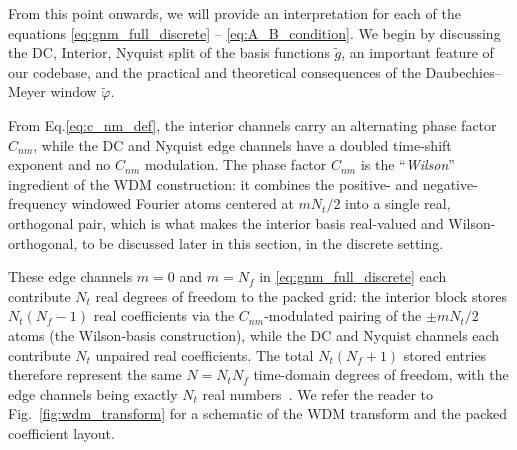 From this point onwards, we will provide an interpretation for each of the equations \eqref{eq:gnm_full_discrete} -- \eqref{eq:A_B_condition}. We begin by discussing the DC, Interior, Nyquist split of the basis functions $\tilde{g}$, an important feature of our codebase, and the practical and theoretical consequences of the Daubechies--Meyer window $\tilde{\varphi}$.


From Eq.\eqref{eq:c_nm_def}, the interior channels carry an alternating phase factor $C_{nm}$, while the DC and Nyquist edge channels have a doubled time-shift exponent and no $C_{nm}$ modulation. The phase factor $C_{nm}$ is the
``\emph{Wilson}'' ingredient of the WDM construction: it combines the
positive- and negative-frequency windowed Fourier atoms centered at $mN_t/2$ into a single real, orthogonal pair, which is what
makes the interior basis real-valued and Wilson-orthogonal, to be discussed later in this section, in the
discrete setting. 

These edge channels $m = 0$ and $m = N_f$ in \eqref{eq:gnm_full_discrete} each contribute $N_t$ real degrees of freedom to
the packed grid: the interior block stores $N_t(N_f{-}1)$ real
coefficients via the $C_{nm}$-modulated pairing of the
$\pm mN_t/2$ atoms (the Wilson-basis construction), while the DC
and Nyquist channels each contribute $N_t$ unpaired real coefficients.
The total $N_t(N_f{+}1)$ stored entries therefore represent the same
$N=N_tN_f$ time-domain degrees of freedom, with the edge channels
being exactly $N_t$ real numbers~\cite{Necula_2012,Cornish:2020odn}. 
We refer the reader to Fig.~\ref{fig:wdm_transform} for a schematic of the WDM transform and the packed coefficient layout.  %

